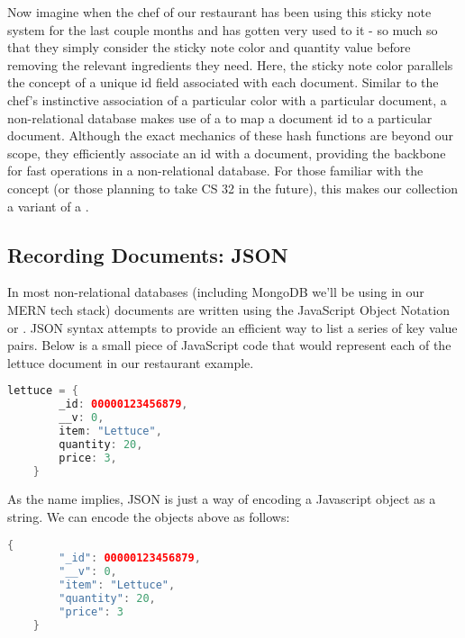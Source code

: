 Now imagine when the chef of our restaurant has been using this sticky note system for the last couple months and has gotten very used to it - so much so that they simply consider the sticky note color and quantity value before removing the relevant ingredients they need. Here, the sticky note color parallels the concept of a unique id field associated with each document. Similar to the chef's instinctive association of a particular color with a particular document, a non-relational database makes use of a  to map a document id to a particular document. Although the exact mechanics of these hash functions are beyond our scope, they efficiently associate an id with a document, providing the backbone for fast operations in a non-relational database. For those familiar with the concept (or those planning to take CS 32 in the future), this makes our collection a variant of a .

\subsection*{Recording Documents: JSON}

In most non-relational databases (including MongoDB we'll be using in our MERN tech stack) documents are written using the JavaScript Object Notation or . JSON syntax attempts to provide an efficient way to list a series of key value pairs. Below is a small piece of JavaScript code that would represent each of the lettuce document in our restaurant example. 

\vspace{.5cm}

\begin{lstlisting}[language=Java]
    lettuce = {
        _id: 00000123456879,
        __v: 0,
        item: "Lettuce",
        quantity: 20,
        price: 3,
    }
\end{lstlisting}

As the name implies, JSON is just a way of encoding a Javascript object as a string. We can encode the objects above as follows:

\begin{lstlisting}[language=Java]
    {
        "_id": 00000123456879,
        "__v": 0,
        "item": "Lettuce",
        "quantity": 20,
        "price": 3
    }
\end{lstlisting}


